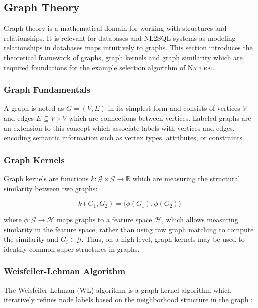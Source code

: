 \subsection{Graph Theory}

Graph theory is a mathematical domain for working with structures and
relationships. It is relevant for databases and NL2SQL systems as modeling
relationships in databases maps intuitively to graphs. This section introduces
the theoretical framework of graphs, graph kernels and graph similarity which
are required foundations for the example selection algorithm of
\textsc{Natural}.

\subsubsection{Graph Fundamentals}

A graph is noted as $G = (V, E)$ in its simplest form and consists of vertices
$V$ and edges $E \subseteq V \times V$ which are connections between vertices.
Labeled graphs are an extension to this concept which associate labels with
vertices and edges, encoding semantic information such as vertex types,
attributes, or constraints.

\subsubsection{Graph Kernels}

Graph kernels are functions $k: \mathcal{G} \times \mathcal{G} \rightarrow
\mathbb{R}$ which are measuring the structural similarity between two graphs:

\begin{equation}
k(G_1, G_2) = \langle \phi(G_1), \phi(G_2) \rangle
\end{equation}

where $\phi: \mathcal{G} \rightarrow \mathcal{H}$ maps graphs to a feature
space $\mathcal{H}$, which allows measuring similarity in the feature space,
rather than using raw graph matching to compute the similarity and $G_i \in
\mathcal{G}$. Thus, on a high level, graph kernels may be used to identify
common super structures in graphs.

\subsubsection{Weisfeiler-Lehman Algorithm}

The Weisfeiler-Lehman (WL) algorithm is a graph kernel algorithm which
iteratively refines node labels based on the neighborhood structure in the
graph \citep{WWL}:

